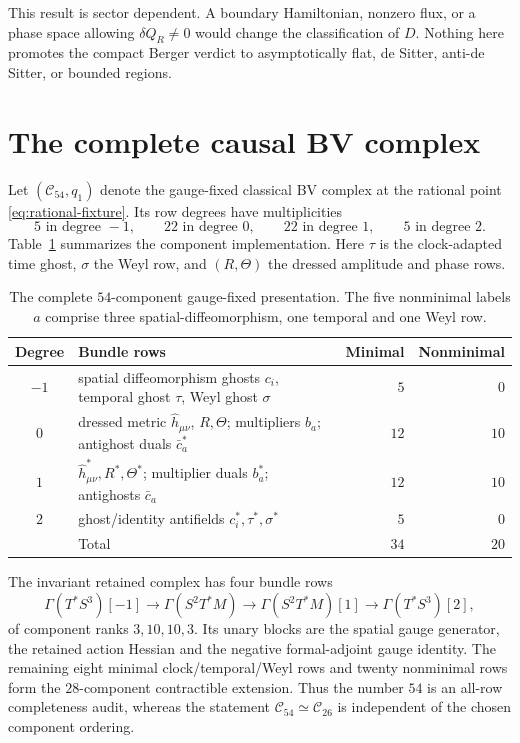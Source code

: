 \documentclass[11pt]{article}
\theoremstyle{definition}
\theoremstyle{remark}
\newcommand{\cC}{\mathcal C}
\begin{document}
This result is sector dependent.  A boundary Hamiltonian, nonzero flux, or a
phase space allowing $\delta Q_R\ne0$ would change the classification of
$D$.  Nothing here promotes the compact Berger verdict to asymptotically
flat, de Sitter, anti-de Sitter, or bounded regions.

\section{The complete causal BV complex}\label{sec:BV}

Let $(\cC_{54},q_1)$ denote the gauge-fixed classical BV complex at the
rational point \eqref{eq:rational-fixture}.  Its row degrees have
multiplicities
\begin{equation}\label{eq:degrees}
 5\text{ in degree }-1,\qquad 22\text{ in degree }0,\qquad
 22\text{ in degree }1,\qquad 5\text{ in degree }2.
\end{equation}
Table~\ref{tab:rows} summarizes the component implementation.  Here $\tau$
is the clock-adapted time ghost, $\sigma$ the Weyl row, and $(R,\Theta)$ the
dressed amplitude and phase rows.
\begin{table}[ht]
\centering
\footnotesize
\begin{tabularx}{\textwidth}{cXrr}
\toprule
Degree & Bundle rows & Minimal & Nonminimal\\
\midrule
$-1$ & spatial diffeomorphism ghosts $c_i$, temporal ghost $\tau$, Weyl ghost
$\sigma$ & $5$ & $0$\\
$0$ & dressed metric $\widehat h_{\mu\nu}$, $R,\Theta$; multipliers $b_a$;
antighost duals $\bar c_a^*$ & $12$ & $10$\\
$1$ & $\widehat h^*_{\mu\nu},R^*,\Theta^*$; multiplier duals $b_a^*$;
antighosts $\bar c_a$ & $12$ & $10$\\
$2$ & ghost/identity antifields $c_i^*,\tau^*,\sigma^*$ & $5$ & $0$\\
\midrule
& Total & $34$ & $20$\\
\bottomrule
\end{tabularx}
\caption{The complete $54$-component gauge-fixed presentation.  The five
nonminimal labels $a$ comprise three spatial-diffeomorphism, one temporal and
one Weyl row.}
\label{tab:rows}
\end{table}

The invariant retained complex has four bundle rows
\begin{equation}\label{eq:retained-bundles}
 \Gamma(T^*S^3)[-1]\longrightarrow
 \Gamma(S^2T^*M)\longrightarrow
 \Gamma(S^2T^*M)[1]\longrightarrow
 \Gamma(T^*S^3)[2],
\end{equation}
of component ranks $3,10,10,3$.  Its unary blocks are the spatial gauge
generator, the retained action Hessian and the negative formal-adjoint gauge
identity.  The remaining eight minimal clock/temporal/Weyl rows and twenty
nonminimal rows form the $28$-component contractible extension.  Thus the
number $54$ is an all-row completeness audit, whereas the statement
$\cC_{54}\simeq\cC_{26}$ is independent of the chosen component ordering.
\end{document}
